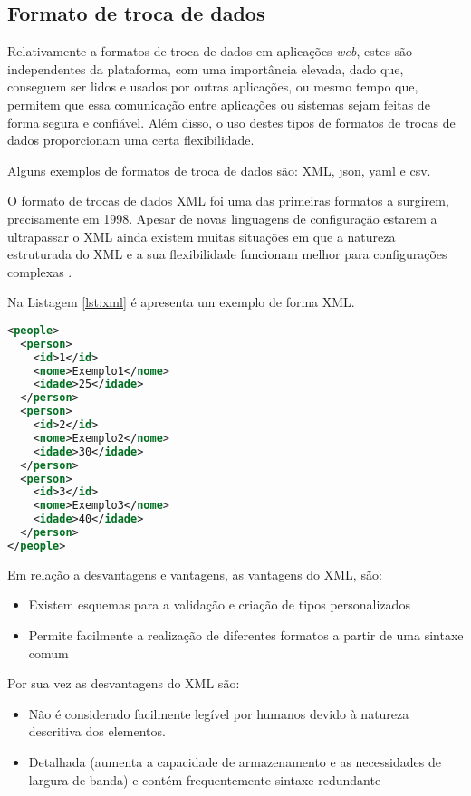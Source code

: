 \subsection{Formato de troca de dados}

Relativamente a formatos de troca de dados em aplicações \textit{web}, estes são independentes da plataforma, com uma importância elevada, dado que, conseguem ser lidos e usados por outras aplicações, ou mesmo tempo que, permitem que essa comunicação entre aplicações ou sistemas sejam feitas de forma segura e confiável. Além disso, o uso destes tipos de formatos de trocas de dados proporcionam uma certa flexibilidade.

Alguns exemplos de formatos de troca de dados são: XML, \ac{json}, \ac{yaml} e \ac{csv}. 

O formato de trocas de dados XML foi uma das primeiras formatos a surgirem, precisamente em 1998. Apesar de novas linguagens de configuração estarem a ultrapassar o XML ainda existem muitas situações em que a natureza estruturada do XML e a sua flexibilidade funcionam melhor para configurações complexas \cite{formatosDeDados}.

Na Listagem \ref{lst:xml} é apresenta um exemplo de forma XML.

\begin{minipage}{0.9\linewidth}
\begin{lstlisting}[language=xml, caption=Exemplo do formato XML. , label=lst:xml]
<people>
  <person>
    <id>1</id>
    <nome>Exemplo1</nome>
    <idade>25</idade>
  </person>
  <person>
    <id>2</id>
    <nome>Exemplo2</nome>
    <idade>30</idade>
  </person>
  <person>
    <id>3</id>
    <nome>Exemplo3</nome>
    <idade>40</idade>
  </person>
</people>
\end{lstlisting}
\end{minipage}

Em relação a desvantagens e vantagens, as vantagens do XML, são:
\begin{itemize}
    \item Existem esquemas para a validação e criação de tipos personalizados
    \item Permite facilmente a realização de diferentes formatos a partir de uma sintaxe comum \cite{formatosDeDados}
\end{itemize}

Por sua vez as desvantagens do XML são:
\begin{itemize}
    \item Não é considerado facilmente legível por humanos devido à natureza descritiva dos elementos.
    \item Detalhada (aumenta a capacidade de armazenamento e as necessidades de largura de banda) e contém frequentemente sintaxe redundante \cite{formatosDeDados}
\end{itemize}

